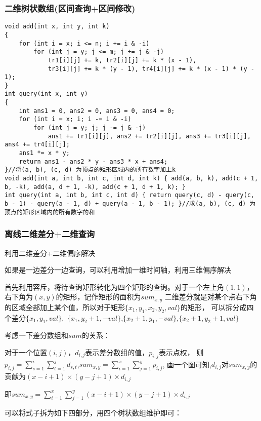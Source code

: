 \documentclass[a4paper, fontset=none]{ctexart}
\begin{document}
\subsubsection{二维树状数组(区间查询+区间修改)}

\begin{verbatim}
void add(int x, int y, int k)
{
    for (int i = x; i <= n; i += i & -i)
        for (int j = y; j <= m; j += j & -j)
            tr1[i][j] += k, tr2[i][j] += k * (x - 1),
            tr3[i][j] += k * (y - 1), tr4[i][j] += k * (x - 1) * (y - 1);
}
int query(int x, int y)
{
    int ans1 = 0, ans2 = 0, ans3 = 0, ans4 = 0;
    for (int i = x; i; i -= i & -i)
        for (int j = y; j; j -= j & -j)
            ans1 += tr1[i][j], ans2 += tr2[i][j], ans3 += tr3[i][j], ans4 += tr4[i][j];
    ans1 *= x * y;
    return ans1 - ans2 * y - ans3 * x + ans4;
}//将(a, b), (c, d) 为顶点的矩形区域内的所有数字加上k
void add(int a, int b, int c, int d, int k) { add(a, b, k), add(c + 1, b, -k), add(a, d + 1, -k), add(c + 1, d + 1, k); }
int query(int a, int b, int c, int d) { return query(c, d) - query(c, b - 1) - query(a - 1, d) + query(a - 1, b - 1); }//求(a, b), (c, d) 为顶点的矩形区域内的所有数字的和

\end{verbatim}
\subsubsection{离线二维差分+二维查询}

利用二维差分+二维偏序解决

如果是一边差分一边查询，可以利用增加一维时间轴，利用三维偏序解决

首先利用容斥，将待查询矩形转化为四个矩形的查询。对于一个左上角$(1, 1)$，右下角为$(x, y)$的矩形，记作矩形的面积为$sum_{x, y}$
二维差分就是对某个点右下角的区域全部加上某个值，所以对于矩形$\{x_1, y_1, x_2, y_2, val\}$的矩形，
可以拆分成四个差分$\{x_1, y_1, val\}$,\ $\{x_1, y_2+1,-val\}$,$\{x_2+1, y_1,-val\}$,$\{x_2+1, y_2+1, val\}$

考虑一下差分数组和$sum$的关系：

对于一个位置$(i, j)$，$d_{i, j}$表示差分数组的值，$p_{i, j}$表示点权，
则$p_{i, j}=\sum_{s=1}^i\sum_{t=1}^jd_{s, t}$,$sum_{x, y}=\sum_{i=1}^x\sum_{j=1}^yp_{i, j}$,
画一个图可知,$d_{i, j}$对$sum_{x, y}$的贡献为$(x-i+1)\times(y-j+1)\times d_{i, j}$

即$sum_{x, y}=\sum_{i=1}^x\sum_{j=1}^y(x-i+1)\times (y-j+1)\times d_{i, j}$

可以将式子拆为如下四部分，用四个树状数组维护即可：
\end{document}
